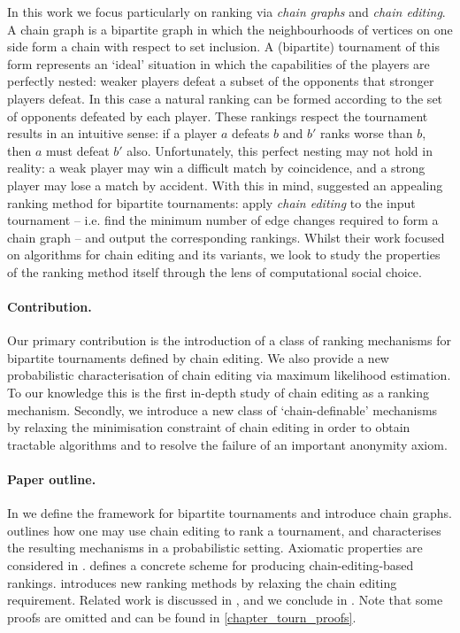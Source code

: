In this work we focus particularly on ranking via \emph{chain graphs} and
\emph{chain editing}. A chain graph is a bipartite graph in which the
neighbourhoods of vertices on one side form a chain with respect to set
inclusion. A (bipartite) tournament of this form represents an `ideal'
situation in which the capabilities of the players are perfectly nested: weaker
players defeat a subset of the opponents that stronger players defeat. In this
case a natural ranking can be formed according to the set of opponents defeated
by each player. These rankings respect the tournament results in an intuitive
sense: if a player $a$ defeats $b$ and $b'$ ranks worse than $b$, then $a$ must
defeat $b'$ also.
%
Unfortunately, this perfect nesting may not hold in reality: a weak player may
win a difficult match by coincidence, and a strong player may lose a match by
accident.
%
With this in mind, \textcite{jiao2017algorithms} suggested an appealing ranking
method for bipartite tournaments: apply \emph{chain editing} to the input
tournament -- i.e. find the minimum number of edge changes required to form a
chain graph -- and output the corresponding rankings. Whilst their work
focused on algorithms for chain editing and its variants, we look to study the
properties of the ranking method itself through the lens of computational social
choice.

\paragraph{Contribution.} Our primary contribution is the introduction of a
class of ranking mechanisms for bipartite tournaments defined by chain editing.
We also provide a new probabilistic characterisation of chain editing via
maximum likelihood estimation. To our knowledge this is the first in-depth
study of chain editing as a ranking mechanism. Secondly, we introduce a new
class of `chain-definable' mechanisms by relaxing the minimisation constraint
of chain editing in order to obtain tractable algorithms and to resolve the
failure of an important anonymity axiom.

\paragraph{Paper outline.} In  we define the
framework for bipartite tournaments and introduce chain graphs.
 outlines how one may use chain editing to
rank a tournament, and characterises the resulting mechanisms in a
probabilistic setting. Axiomatic properties are considered in
.  defines a
concrete scheme for producing chain-editing-based rankings.
 introduces new ranking methods by relaxing the
chain editing requirement. Related work is discussed in
, and we conclude in .
Note that some proofs are omitted and can be found
in \cref{chapter_tourn_proofs}.

